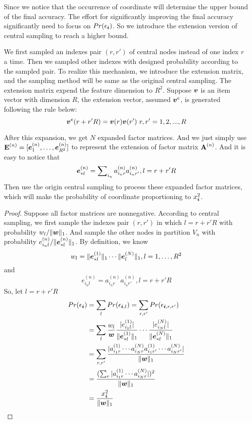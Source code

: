 \documentclass[letterpaper]{article}
\newcommand{\Sca}[3]{{#1}^{(#2)}_{i_#2#3}}%
\newcommand{\V}[1]{{\bm{{\MakeLowercase{#1}}}}}
\newcommand{\VnC}[3]{\V{#1}^{(#2)}_{#3}}
\newcommand{\M}[1]{{\bm{\mathbf{\MakeUppercase{#1}}}}}
\newcommand{\norm}[2]{\|#1\|_{#2}}
\begin{document}
Since we notice that the occurrence of coordinate will determine the upper bound of the final accuracy. The effort for significantly improving the final accuracy significantly need to focus on $Pr(\epsilon_{\V{i}})$. So we introduce the extension version of central sampling to reach a higher bound.

We first sampled an indexes pair $(r,r')$ of central nodes instead of one index $r$ a time. Then we sampled other indexes with designed probability according to the sampled pair. To realize this mechanism, we introduce the extension matrix, and the sampling method will be same as the original central sampling. The extension matrix expend the feature dimension to $R^2$. Suppose $\V{v}$ is an item vector with dimension $R$, the extension vector, assumed $\V{v}^e$, is generated following the rule below:
\[
\V{v}^e(r+r'R) = \V{v}(r)\V{v}(r')\ r,r' = {1,2,...,R}
\]

After this expansion, we get $N$ expanded factor matrices. And we just simply use $\M{E}^{(n)}=[\VnC{e}{n}{1},\ldots,\VnC{e}{n}{R^2}]$ to represent the extension of factor matrix $\M{A}^{(n)}$. And it is easy to notice that
\[
\VnC{e}{n}{*l} = \sum\nolimits_{i_n}\Sca{a}{n}{r}\Sca{a}{n}{r'},l=r+r'R
\]
Then use the origin central  sampling to process these expanded factor matrices, which will make the probability of coordinate proportioning to $x_{\V{i}}^2$.
\begin{proof}
Suppose all factor matrices are nonnegative. According to central sampling, we first sample the indexes pair $(r,r')$ in which $l = r+r'R$ with probability $w_l/\norm{\V{w}}{1}$. And sample the other nodes in partition $V_n$ with probability $e^{(n)}_{i_nl}/\norm{\VnC{e}{n}{*l}}{1}$. By definition, we know
\[
w_l = \norm{\VnC{e}{1}{*l}}{1}\cdots \norm{\VnC{e}{N}{l}}{1}, l = 1,\ldots,R^2
\]
and
\[
e^{(n)}_{i_nl} = \Sca{a}{n}{r}\Sca{a}{n}{r'}, l = r+r'R
\]
So, let $l = r+r'R$
\begin{align*}
Pr(\epsilon_{\V{i}}) &= \sum_{l} Pr(\epsilon_{\V{i},l})= \sum_{r,r'} Pr(\epsilon_{\V{i},r,r'})\\
&= \sum_{l} \frac{w_l}{\V{w}}
\frac{|e^{(1)}_{i_1l}|}{\norm{\VnC{e}{1}{*l}}{1}}\cdots
\frac{|e^{(N)}_{i_Nl}|}{\norm{\VnC{e}{N}{*l}}{1}}\\
& = \sum_{r,r'} \frac{|\Sca{a}{1}{r}\cdots\Sca{a}{N}{r}\Sca{a}{1}{r'}\cdots\Sca{a}{N}{r'}|}
{\norm{\V{W}}{1}}\\
& = \frac{(\sum_{r}|\Sca{a}{1}{r}\cdots\Sca{a}{N}{r}|)^2}{\norm{\V{W}}{1}}\\
& = \frac{x_{\V{i}}^2}{\norm{\V{w}}{1}}
\end{align*}
\end{proof}
\end{document}
